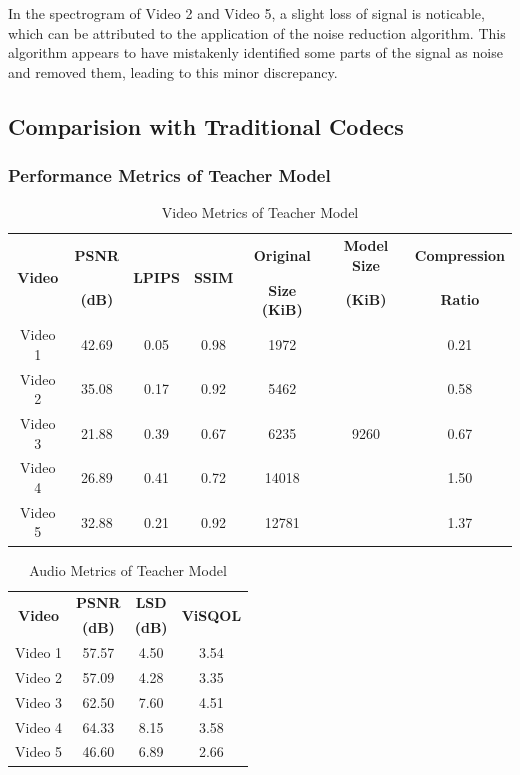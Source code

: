 In the spectrogram of Video 2 and Video 5, a slight loss of signal is noticable, which can be attributed to the application of the noise reduction algorithm. This algorithm appears to have mistakenly identified some parts of the signal as noise and removed them, leading to this minor discrepancy.


\subsection{Comparision with Traditional Codecs}
    \subsubsection{Performance Metrics of Teacher Model}
    \begin{table}[H]
        \centering
        \caption{Video Metrics of Teacher Model}
        \label{table:video-metric-teacher}
        \begin{tabular}{|c|c|c|c|c|c|c|}
        \hline
        \multirow{2}{*}{\textbf{Video}} & \textbf{PSNR} & \multirow{2}{*}{\textbf{LPIPS}} & \multirow{2}{*}{\textbf{SSIM}} & \textbf{Original} & \textbf{Model Size} & \textbf{Compression} \\
        & \textbf{(dB)} &  &  & \textbf{Size (KiB)} & \textbf{(KiB)} & \textbf{Ratio} \\
        \hline
        Video 1 & 42.69 & 0.05 & 0.98 & 1972 & \multirow{5}{*}{9260} & 0.21 \\
        \cline{1-5} \cline{7-7}
        Video 2 & 35.08 & 0.17 & 0.92 & 5462 &  & 0.58 \\
        \cline{1-5} \cline{7-6}
        Video 3 & 21.88 & 0.39 & 0.67 & 6235 &  & 0.67 \\
        \cline{1-5} \cline{7-7}
        Video 4 & 26.89 & 0.41 & 0.72 & 14018 &  & 1.50 \\
        \cline{1-5} \cline{7-7}
        Video 5 & 32.88 & 0.21 & 0.92 & 12781 &  & 1.37 \\
        \hline
        \end{tabular}
    \end{table}
    
    \begin{table}[H]
        \centering
        \caption{Audio Metrics of Teacher Model}
        \label{table:audio-metric-teacher}
        \begin{tabular}{|c|c|c|c|}
        \hline
        \multirow{2}{*}{\textbf{Video}} & \textbf{PSNR} & \textbf{LSD} & \multirow{2}{*}{\textbf{ViSQOL}}\\
        & \textbf{(dB)} & \textbf{(dB)} &  \\
        \hline
        Video 1 & 57.57 & 4.50 & 3.54 \\
        \hline
        Video 2 & 57.09 & 4.28 & 3.35 \\
        \hline
        Video 3 & 62.50 & 7.60 & 4.51 \\
        \hline
        Video 4 & 64.33 & 8.15 & 3.58 \\
        \hline
        Video 5 & 46.60 & 6.89 & 2.66 \\
        \hline
        \end{tabular}
    \end{table}

